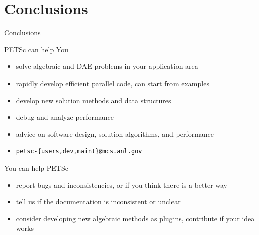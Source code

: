 



%
%
\section{Conclusions}
\begin{frame}{Conclusions}
 
 \begin{block}{PETSc can help You}
  \begin{itemize}
   \item solve algebraic and DAE problems in your application area
   \item rapidly develop efficient parallel code, can start from examples
   \item develop new solution methods and data structures
   \item debug and analyze performance
   \item advice on software design, solution algorithms, and performance
   \item \centering \texttt{petsc-\{users,dev,maint\}@mcs.anl.gov}

  \end{itemize}
 \end{block}

 \begin{block}{You can help PETSc}
  \begin{itemize}
   \item report bugs and inconsistencies, or if you think there is a better way
   \item tell us if the documentation is inconsistent or unclear
   \item consider developing new algebraic methods as plugins, contribute if your idea works
  \end{itemize}
 \end{block}

\end{frame}


